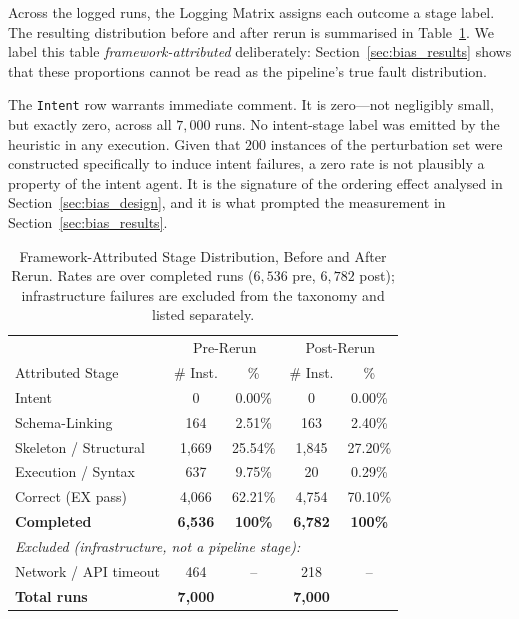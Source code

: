 \documentclass[conference]{IEEEtran}
\begin{document}
Across the logged runs, the Logging Matrix assigns each outcome a stage label.
The resulting distribution before and after rerun is summarised in
Table~\ref{tab:failures}. We label this table \emph{framework-attributed}
deliberately: Section~\ref{sec:bias_results} shows that these proportions
cannot be read as the pipeline's true fault distribution.

The \texttt{Intent} row warrants immediate comment. It is zero---not
negligibly small, but exactly zero, across all $7{,}000$ runs. No intent-stage
label was emitted by the heuristic in any execution. Given that $200$ instances
of the perturbation set were constructed specifically to induce intent
failures, a zero rate is not plausibly a property of the intent agent. It is
the signature of the ordering effect analysed in
Section~\ref{sec:bias_design}, and it is what prompted the measurement in
Section~\ref{sec:bias_results}.

\begin{table}[htbp]
\centering
\caption{Framework-Attributed Stage Distribution, Before and After Rerun.
Rates are over completed runs ($6{,}536$ pre, $6{,}782$ post); infrastructure
failures are excluded from the taxonomy and listed separately.}
\begin{tabular}{lcccc}
\toprule
& \multicolumn{2}{c}{Pre-Rerun} & \multicolumn{2}{c}{Post-Rerun} \\
Attributed Stage & \# Inst. & \% & \# Inst. & \% \\
\midrule
Intent                 & 0       & 0.00\%  & 0       & 0.00\% \\
Schema-Linking         & 164     & 2.51\%  & 163     & 2.40\% \\
Skeleton / Structural  & 1{,}669 & 25.54\% & 1{,}845 & 27.20\% \\
Execution / Syntax     & 637     & 9.75\%  & 20      & 0.29\% \\
Correct (EX pass)      & 4{,}066 & 62.21\% & 4{,}754 & 70.10\% \\
\midrule
\textbf{Completed}     & \textbf{6{,}536} & \textbf{100\%} & \textbf{6{,}782} & \textbf{100\%} \\
\midrule
\multicolumn{5}{l}{\emph{Excluded (infrastructure, not a pipeline stage):}} \\
Network / API timeout  & 464     & --      & 218     & -- \\
\midrule
\textbf{Total runs}    & \textbf{7{,}000} & & \textbf{7{,}000} & \\
\bottomrule
\end{tabular}
\label{tab:failures}
\end{table}
\end{document}
